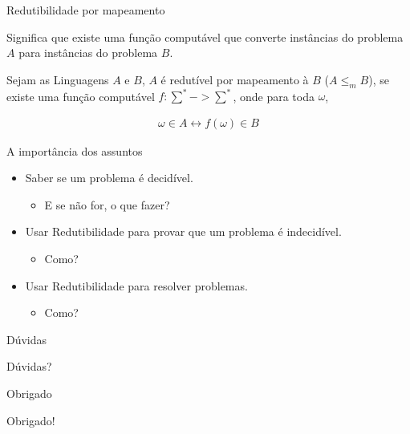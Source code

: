 \documentclass{beamer}
\begin{document}
  \begin{frame}{Redutibilidade por mapeamento}

    Significa que existe uma função computável que converte instâncias do problema $A$ para instâncias do problema $B$.\newline

    Sejam as Linguagens $A$ e $B$, $A$ é redutível por mapeamento à $B$ ($A \le_{m} B$), se existe uma função computável $f : \sum^{*} -> \sum^{*}$, onde para toda $\omega$,\newline

    \begin{align*}
      \omega \in A \leftrightarrow f(\omega) \in B
    \end{align*}

  \end{frame}

  \begin{frame}{A importância dos assuntos}

    \begin{itemize}

      \item Saber se um problema é decidível.
      \begin{itemize}
        \item E se não for, o que fazer?\newline
      \end{itemize}

      \item Usar Redutibilidade para provar que um problema é indecidível.
      \begin{itemize}
        \item Como?\newline
      \end{itemize}

      \item Usar Redutibilidade para resolver problemas.
      \begin{itemize}
        \item Como?\newline
      \end{itemize}
    \end{itemize}

  \end{frame}

  \begin{frame}{Dúvidas}

    \Huge{\centerline{Dúvidas?}}

  \end{frame}

  \begin{frame}{Obrigado}

    \Huge{\centerline{Obrigado!}}

  \end{frame}
\end{document}
